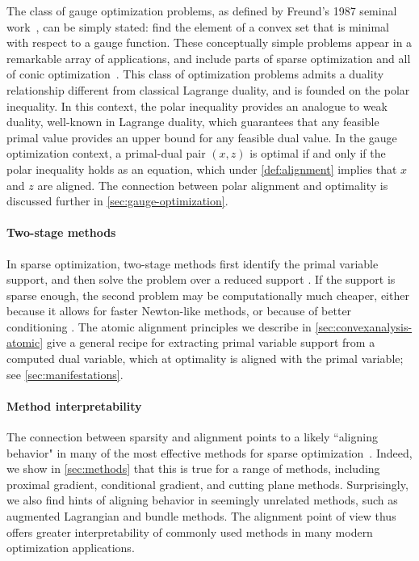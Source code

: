 The class of gauge optimization problems, as defined by Freund's 1987 seminal
work~\citep{freund1987dual}, can be simply stated: find the element of a convex
set that is minimal with respect to a gauge function. These conceptually simple
problems appear in a remarkable array of applications, and include parts of
sparse optimization and all of conic
optimization~\cite[Example~1.3]{friedlander2014gauge}. This class of
optimization problems admits a duality relationship different from classical
Lagrange duality, and is founded on the polar inequality.
In this context, the polar inequality provides an analogue to weak duality,
well-known in Lagrange duality, which guarantees that any
feasible primal value provides an upper bound for any feasible dual
value. In the gauge optimization context, a primal-dual pair $(x,z)$ is optimal
if and only if the polar inequality holds as an equation, which under
\autoref{def:alignment} implies that $x$ and $z$ are
aligned. 
The connection between polar alignment and optimality is
discussed further in \autoref{sec:gauge-optimization}.

\paragraph{Two-stage methods}
In sparse optimization, two-stage methods first identify the primal variable
support, and then solve the problem over a reduced support
\cite{ko1994iterative,cristofari2017two}. If the support is sparse enough, the
second problem may be computationally much cheaper, either because it allows for
faster Newton-like methods, or because of better conditioning
\cite{negahban2012restricted}. The atomic alignment principles we describe in
\autoref{sec:convexanalysis-atomic} give a general recipe for extracting primal
variable support from a computed dual variable, which at optimality is aligned
with the primal variable; see \autoref{sec:manifestations}. 

\paragraph{Method interpretability}
The connection between sparsity and alignment points to a likely ``aligning
behavior" in many of the most effective methods for sparse
optimization~\cite{hare2004identifying}. Indeed, we show in \autoref{sec:methods}
that this is true for a range of methods, including proximal gradient,
conditional gradient, and cutting plane methods. Surprisingly, we also find
hints of aligning behavior in seemingly unrelated methods, such as augmented
Lagrangian and bundle methods. The alignment point of view thus offers greater
interpretability of commonly used methods in many modern optimization
applications.

